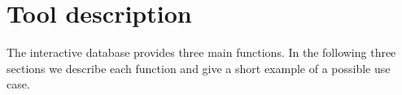 \section{Tool description}

The interactive database provides three main functions. In the following three sections we describe each function and give a short example of a possible use case.
